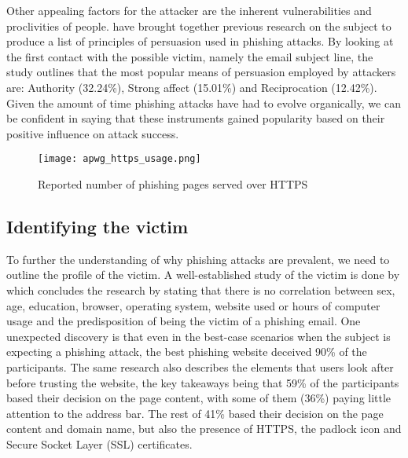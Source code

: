 Other appealing factors for the attacker are the inherent vulnerabilities and proclivities of people. \cite{Ana_Ferreira} have brought together previous research on the subject to produce a list of principles of persuasion used in phishing attacks. By looking at the first contact with the possible victim, namely the email subject line, the study outlines that the most popular means of persuasion employed by attackers are: Authority (32.24\%), Strong affect (15.01\%) and Reciprocation (12.42\%). Given the amount of time phishing attacks have had to evolve organically, we can be confident in saying that these instruments gained popularity based on their positive influence on attack success.

\begin{figure}[!b]
	\centering
	\texttt{[image: apwg\_https\_usage.png]}
	\caption{
		Reported number of phishing pages served over HTTPS \citep{APWG_Q42019}}
	\label{fig:HTTPS_USAGE}
\end{figure}


\subsection{Identifying the victim}
\label{subsec:identifying_the_victim}
To further the understanding of why phishing attacks are prevalent, we need to outline the profile of the victim. A well-established study of the victim is done by \cite{Rachna_Dhamija} which concludes the research by stating that there is no correlation between sex, age, education, browser, operating system, website used or hours of computer usage and the predisposition of being the victim of a phishing email. One unexpected discovery is that even in the best-case scenarios when the subject is expecting a phishing attack, the best phishing website deceived 90\% of the participants. The same research also describes the elements that users look after before trusting the website, the key takeaways being that 59\% of the participants based their decision on the page content, with some of them (36\%) paying little attention to the address bar. The rest of 41\% based their decision on the page content and domain name, but also the presence of HTTPS, the padlock icon and Secure Socket Layer (SSL) certificates.

